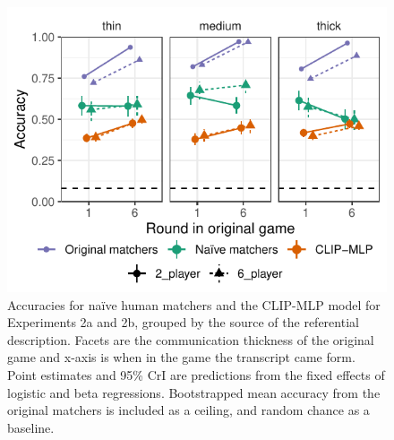 \documentclass[10pt, letterpaper]{article}
\begin{document}
\begin{CodeChunk}
\begin{figure}[t]

{\centering \includegraphics[width=0.9\linewidth]{figs/fig-condition-1} 

}

\caption[Accuracies for naïve human matchers and the CLIP-MLP model for Experiments 2a and 2b, grouped by the source of the referential description]{Accuracies for naïve human matchers and the CLIP-MLP model for Experiments 2a and 2b, grouped by the source of the referential description. Facets are the communication thickness of the original game and x-axis is when in the game the transcript came form. Point estimates and 95\% CrI are predictions from the fixed effects of logistic and beta regressions. Bootstrapped mean accuracy from the original matchers is included as a ceiling, and random chance as a baseline. \label{expt2-condition}}\label{fig:fig-condition}
\end{figure}
\end{CodeChunk}
\end{document}
